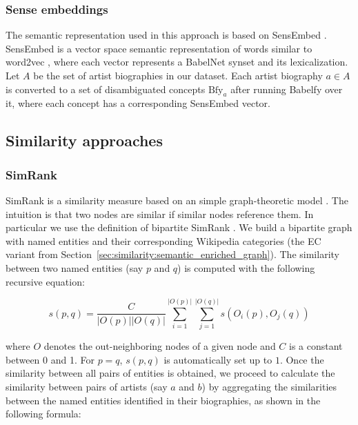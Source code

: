 \subsubsection{Sense embeddings}\label{sec:similarity:sense_embeddings}

The semantic representation used in this approach is based on SensEmbed \citep{Iacobaccietal2015}. SensEmbed is a vector space semantic representation of words similar to word2vec \citep{Mikolovetal2013},
where each vector represents a BabelNet synset and its lexicalization. Let $A$ be the set of artist biographies in our dataset. Each artist biography $a \in A$ is converted to a set of disambiguated concepts $\text{Bfy}_{a}$ after running Babelfy over it, where each concept has a corresponding SensEmbed vector.


\subsection{Similarity approaches}
\label{sec:similarity:similarity_approaches}

\subsubsection{SimRank} %

SimRank is a similarity measure based on an simple graph-theoretic model \citep{jeh2002simrank}. The intuition is that two nodes are similar if similar nodes reference them. In particular we use the definition of bipartite SimRank \citep{jeh2002simrank}. We build a bipartite graph with named entities and their corresponding Wikipedia categories (the EC variant from Section~\ref{sec:similarity:semantic_enriched_graph}). The similarity between two named entities (say $p$ and $q$) is computed with the following recursive equation:

\begin{equation}
s(p,q) = \frac{C}{|O(p)||O(q)|} \sum_{i=1}^{|O(p)|} \sum_{j=1}^{|O(q)|} s(O_i(p), O_j(q))
\end{equation}

where $O$ denotes the out-neighboring nodes of a given node and $C$ is a constant between 0 and 1. For $p = q$, $s(p,q)$ is automatically set up to $1$.
Once the similarity between all pairs of entities is obtained, we proceed to calculate the similarity between pairs of artists (say $a$ and $b$) by aggregating the similarities between the named entities identified in their biographies, as shown in the following formula:

